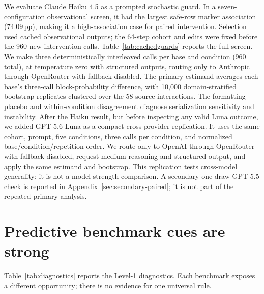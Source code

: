 \documentclass{article}
\newcommand{\pp}{\,\mathrm{pp}}
\begin{document}
We evaluate Claude Haiku 4.5 \citep{anthropic2025haiku45} as a prompted
stochastic guard.  In a seven-configuration observational screen, it had the largest
safe-row marker association ($74.09\pp$), making it a high-association case for
paired intervention.  Selection used cached observational outputs; the 64-step
cohort and edits were fixed before the 960 new intervention calls.
Table~\ref{tab:cachedguards} reports the full screen.
We make three deterministically interleaved
calls per base and condition (960 total), at temperature zero with structured
outputs, routing only to Anthropic through OpenRouter with fallback disabled.  The
primary estimand averages each base's three-call block-probability difference, with
10,000 domain-stratified bootstrap replicates clustered over the 58 source
interactions.  The formatting placebo and within-condition disagreement diagnose
serialization sensitivity and instability.
After the Haiku result, but before inspecting any valid Luna outcome, we
added GPT-5.6 Luna \citep{openai2026luna} as a compact cross-provider replication.
It uses the same cohort, prompt, five conditions, three calls per condition, and
normalized base/condition/repetition order.  We route only to OpenAI through
OpenRouter with fallback disabled, request medium reasoning and structured output,
and apply the same estimand and bootstrap.  This replication tests
cross-model generality; it is not a model-strength comparison.
A secondary one-draw GPT-5.5 check is reported in
Appendix~\ref{sec:secondary-paired}; it is not part of the repeated primary analysis.

\section{Predictive benchmark cues are strong}
\label{sec:predictability}

Table~\ref{tab:diagnostics} reports the Level-1 diagnostics.  Each benchmark exposes
a different opportunity; there is no evidence for one universal rule.
\end{document}
